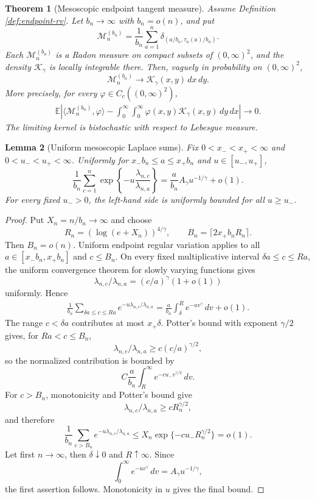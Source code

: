 \documentclass[11pt]{article}
\newtheorem{theorem}{Theorem}[section]
\newtheorem{lemma}[theorem]{Lemma}
\theoremstyle{remark}
\newcommand{\Ee}{\mathbb E}
\newcommand{\dd}{\,d}
\begin{document}
\begin{theorem}[Mesoscopic endpoint tangent measure]
\label{thm:endpoint-tangent-measure}
Assume Definition \ref{def:endpoint-rv}.  Let $b_n\to\infty$ with
$b_n=o(n)$, and put
\[
        \mathcal M_n^{(b_n)}
        =\frac1{b_n}\sum_{a=1}^n
        \delta_{(a/b_n,\tau_n(a)/b_n)}.
\]
Each \(\mathcal M_n^{(b_n)}\) is a Radon measure on compact subsets of
\((0,\infty)^2\), and the density \(\mathcal K_\gamma\) is locally
integrable there.  Then, vaguely in probability on $(0,\infty)^2$,\[
        \mathcal M_n^{(b_n)}
        \longrightarrow
        \mathcal K_\gamma(x,y)\dd x\dd y.
\]
More precisely, for every $\varphi\in C_c((0,\infty)^2)$,
\[
\begin{aligned}
        \Ee\left|
        \langle\mathcal M_n^{(b_n)},\varphi\rangle
        -\int_0^\infty\int_0^\infty
        \varphi(x,y)\mathcal K_\gamma(x,y)\dd y\dd x
        \right|\longrightarrow0.
\end{aligned}
\]
The limiting kernel is bistochastic with respect to Lebesgue measure.
\end{theorem}

\begin{lemma}[Uniform mesoscopic Laplace sums]
\label{lem:mesoscopic-laplace-sums}
Fix $0<x_-<x_+<\infty$ and $0<u_-<u_+<\infty$.  Uniformly for
$x_-b_n\le a\le x_+b_n$ and $u\in[u_-,u_+]$,
\[
        \frac1{b_n}\sum_{c=1}^n
        \exp\left\{-u\frac{\lambda_{n,c}}{\lambda_{n,a}}\right\}
        =\frac a{b_n}A_\gamma u^{-1/\gamma}+o(1).
\]
For every fixed $u_->0$, the left-hand side is uniformly bounded for all
$u\ge u_-$.
\end{lemma}

\begin{proof}
Put $X_n=n/b_n\to\infty$ and choose
\[
        R_n=(\log(e+X_n))^{4/\gamma},
        \qquad B_n=\lceil2x_+b_nR_n\rceil.
\]
Then $B_n=o(n)$.  Uniform endpoint regular variation applies to all
$a\in[x_-b_n,x_+b_n]$ and $c\le B_n$.  On every fixed multiplicative interval
$\delta a\le c\le Ra$, the uniform convergence theorem for slowly varying
functions gives
\[
        \lambda_{n,c}/\lambda_{n,a}=(c/a)^\gamma(1+o(1))
\]
uniformly.  Hence
\[
\begin{aligned}
        \frac1{b_n}\sum_{\delta a\le c\le Ra}
        e^{-u\lambda_{n,c}/\lambda_{n,a}}
        =\frac a{b_n}\int_\delta^R e^{-uv^\gamma}\dd v+o(1).
\end{aligned}
\]
The range $c<\delta a$ contributes at most $x_+\delta$.  Potter's bound with
exponent $\gamma/2$ gives, for $Ra<c\le B_n$,
\[
        \lambda_{n,c}/\lambda_{n,a}
        \ge c(c/a)^{\gamma/2},
\]
so the normalized contribution is bounded by
\[
        C\frac a{b_n}\int_R^\infty e^{-cu_-v^{\gamma/2}}\dd v.
\]
For $c>B_n$, monotonicity and Potter's bound give
\[
        \lambda_{n,c}/\lambda_{n,a}\ge cR_n^{\gamma/2},
\]
and therefore
\[
        \frac1{b_n}\sum_{c>B_n}
        e^{-u\lambda_{n,c}/\lambda_{n,a}}
        \le X_n\exp\{-cu_-R_n^{\gamma/2}\}=o(1).
\]
Let first $n\to\infty$, then $\delta\downarrow0$ and $R\uparrow\infty$.
Since
\[
        \int_0^\infty e^{-uv^\gamma}\dd v
        =A_\gamma u^{-1/\gamma},
\]
the first assertion follows.  Monotonicity in $u$ gives the final bound.
\end{proof}
\end{document}
